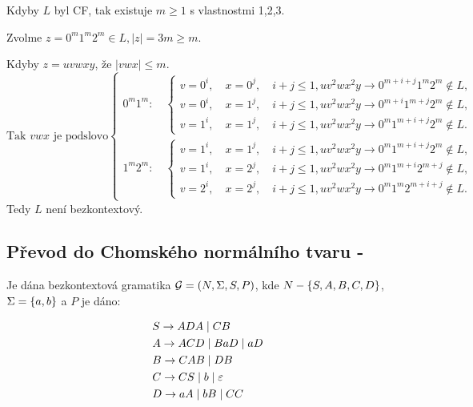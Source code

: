 Kdyby $L$ byl CF, tak existuje $m \geq 1$ s vlastnostmi 1,2,3.

Zvolme $z = 0^m 1^m 2^m \in L, |z| = 3m \geq m$.

Kdyby $z = uvwxy$, že $|vwx| \leq m$. 
\[
\text{Tak $vwx$ je podslovo}
\begin{cases}
    0^m 1^m:\quad 
      \begin{cases}
        v = 0^i,\quad x = 0^j,\quad i+j \leq 1, uv^2wx^2y \rightarrow 0^{m+i+j}1^m2^m \not\in L, \\[1ex]
        v = 0^i,\quad x = 1^j,\quad i+j \leq 1, uv^2wx^2y \rightarrow 0^{m+i}1^{m+j}2^m \not\in L, \\[1ex]
        v = 1^i,\quad x = 1^j,\quad i+j \leq 1, uv^2wx^2y \rightarrow 0^{m}1^{m+i+j}2^m \not\in L.
      \end{cases}
    \\[2ex]
    1^m 2^m:\quad 
      \begin{cases}
        v = 1^i,\quad x = 1^j,\quad i+j \leq 1, uv^2wx^2y \rightarrow 0^{m}1^{m+i+j}2^m \not\in L, \\[1ex]
        v = 1^i,\quad x = 2^j,\quad i+j \leq 1, uv^2wx^2y \rightarrow 0^{m}1^{m+i}2^{m+j} \not\in L, \\[1ex]
        v = 2^i,\quad x = 2^j,\quad i+j \leq 1, uv^2wx^2y \rightarrow 0^{m}1^{m}2^{m+i+j} \not\in L.
      \end{cases}
\end{cases}
\]
Tedy $L$ není bezkontextový.

\newpage
\subsection{Převod do Chomského normálního tvaru - }

Je dána bezkontextová gramatika $\mathcal{G} = (N, \Sigma, S, P)$, kde $N - \left\lbrace S, A, B, C, D \right\rbrace$, $\Sigma = \left\lbrace a, b \right\rbrace$ a $P$ je dáno: 

\begin{align*}
    & S \to ADA \mid CB\\
    & A \to ACD \mid BaD \mid aD \\
    & B \to CAB \mid DB \\ 
    & C \to CS \mid b \mid \varepsilon \\ 
    & D \to aA \mid bB \mid CC \\ 
\end{align*}

